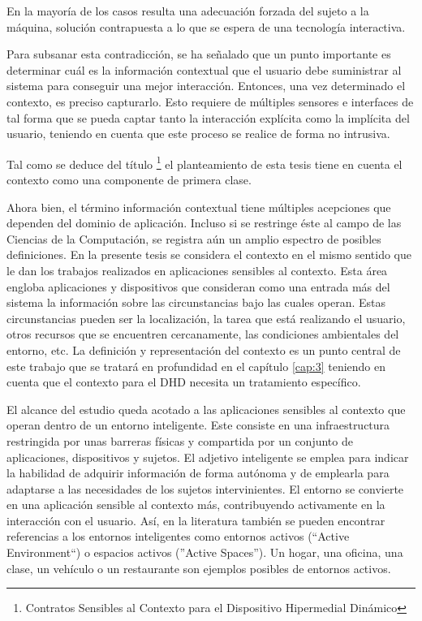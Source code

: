 En la mayoría de los casos resulta una adecuación forzada del sujeto a la
máquina, solución contrapuesta a lo que se espera de una tecnología interactiva.

Para subsanar esta contradicción, se ha señalado que un punto importante es
determinar cuál es la información contextual que el usuario debe suministrar al
sistema para conseguir una mejor interacción. Entonces, una vez determinado el
contexto, es preciso capturarlo. Esto requiere de múltiples sensores e
interfaces de tal forma que se pueda captar tanto la interacción explícita como
la implícita del usuario, teniendo en cuenta que este proceso se realice de
forma no intrusiva.  

Tal como se deduce del título \footnote{Contratos Sensibles al Contexto
para el Dispositivo Hipermedial Dinámico} el planteamiento de esta tesis
tiene en cuenta el contexto como una componente de primera clase.

Ahora bien, el término información contextual tiene múltiples acepciones
que dependen del dominio de aplicación. Incluso si se restringe éste al campo de
las Ciencias de la Computación, se registra aún un amplio espectro de posibles
definiciones. En la presente tesis se considera el contexto en el mismo
sentido que le dan los trabajos realizados en aplicaciones sensibles al
contexto. Esta área engloba aplicaciones y dispositivos que consideran como una
entrada más del sistema la información sobre las circunstancias bajo las cuales
operan. Estas circunstancias pueden ser la localización, la tarea que está
realizando el usuario, otros recursos que se encuentren cercanamente, las
condiciones ambientales del  entorno, etc. La definición y representación del
contexto es un punto central de este trabajo que se tratará en profundidad en el
capítulo \ref{cap:3} teniendo en cuenta que el contexto para el DHD necesita un
tratamiento específico. 

El alcance del estudio queda acotado a las aplicaciones sensibles al contexto
que operan dentro de un entorno inteligente. Este consiste en una
infraestructura restringida por unas barreras físicas y compartida por un
conjunto de aplicaciones, dispositivos y sujetos. El adjetivo inteligente se
emplea para indicar la habilidad de adquirir información de forma autónoma y de
emplearla para adaptarse a las necesidades de los sujetos intervinientes. El
entorno se convierte en una aplicación sensible al contexto más, contribuyendo
activamente en la interacción con el usuario. Así, en la literatura también se
pueden encontrar referencias a los entornos inteligentes como entornos activos
(``Active Environment``) o espacios activos (''Active Spaces''). Un
hogar, una oficina, una clase, un vehículo o un restaurante son ejemplos
posibles de entornos activos. 

